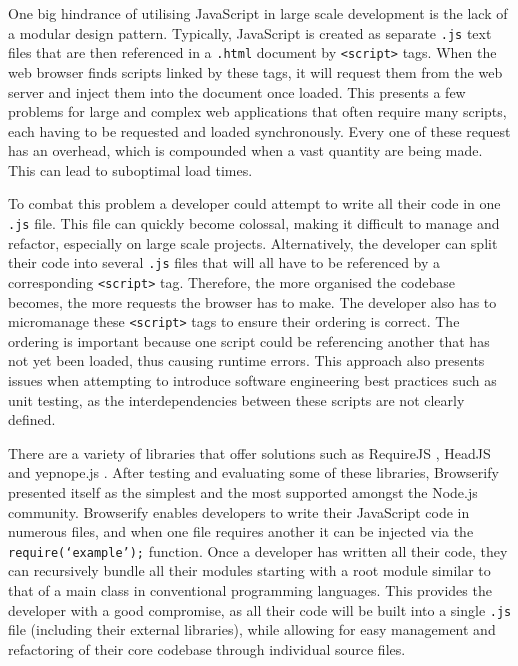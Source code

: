 \documentclass[final]{cmpreport}
\begin{document}
One big hindrance of utilising JavaScript in large scale development is the lack of a modular design pattern. Typically, JavaScript is created as separate \texttt{.js} text files that are then referenced in a \texttt{.html} document by \texttt{<script>} tags. When the web browser finds scripts linked by these tags, it will request them from the web server and inject them into the document once loaded. This presents a few problems for large and complex web applications that often require many scripts, each having to be requested and loaded synchronously. Every one of these request has an overhead, which is compounded when a vast quantity are being made. This can lead to suboptimal load times.

To combat this problem a developer could attempt to write all their code in one \texttt{.js} file. This file can quickly become colossal, making it difficult to manage and refactor, especially on large scale projects. Alternatively, the developer can split their code into several \texttt{.js} files that will all have to be referenced by a corresponding \texttt{<script>} tag. Therefore, the more organised the codebase becomes, the more requests the browser has to make. The developer also has to micromanage these \texttt{<script>} tags to ensure their ordering is correct. The ordering is important because one script could be referencing another that has not yet been loaded, thus causing runtime errors. This approach also presents issues when attempting to introduce software engineering best practices such as unit testing, as the interdependencies between these scripts are not clearly defined.

There are a variety of libraries that offer solutions such as RequireJS \footnotemark , HeadJS \footnotemark  and yepnope.js \footnotemark . After testing and evaluating some of these libraries, Browserify \footnotemark presented itself as the simplest and the most supported amongst the Node.js community. Browserify enables developers to write their JavaScript code in numerous files, and when one file requires another it can be injected via the \texttt{require(`example');} function. Once a developer has written all their code, they can recursively bundle all their modules starting with a root module similar to that of a main class in conventional programming languages. This provides the developer with a good compromise, as all their code will be built into a single \texttt{.js} file (including their external libraries), while allowing for easy management and refactoring of their core codebase through individual source files.
\end{document}
